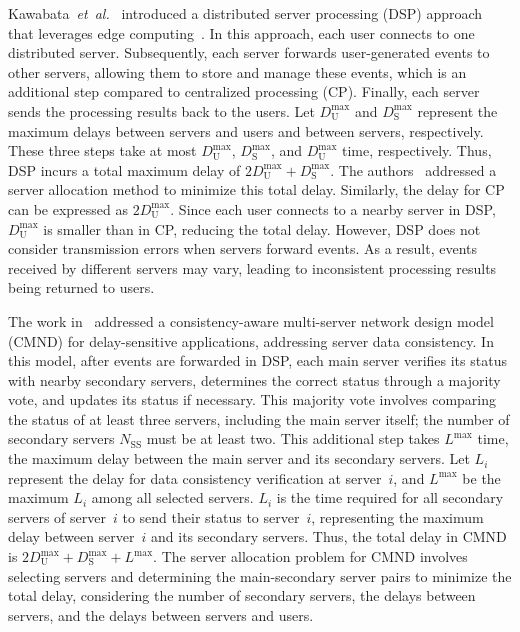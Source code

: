 \documentclass[10pt, letterpaper]{IEEEtran}
\begin{document}
\begin{CJK}{UTF8}{ipxm}
Kawabata~{\it et~al.}~\cite{2Kawabata2017} introduced a distributed server processing (DSP) approach that leverages edge computing~\cite{edge_26,edge_27,edge_28,edge_29}. 
In this approach, each user connects to one distributed server. 
Subsequently, each server forwards user-generated events to other servers, allowing them to store and manage these events, which is an additional step compared to centralized processing (CP). 
Finally, each server sends the processing results back to the users. 
Let $D_\mathrm{U}^{\max}$ and $D_\mathrm{S}^{\max}$ represent the maximum delays between servers and users and between servers, respectively. 
These three steps take at most $D_\mathrm{U}^{\max}$, $D_\mathrm{S}^{\max}$, and $D_\mathrm{U}^{\max}$ time, respectively. 
Thus, DSP incurs a total maximum delay of $2D_\mathrm{U}^{\max} + D_\mathrm{S}^{\max}$. 
The authors~\cite{2Kawabata2017} addressed a server allocation method to minimize this total delay. 
Similarly, the delay for CP can be expressed as $2D_\mathrm{U}^{\max}$. 
Since each user connects to a nearby server in DSP, $D_\mathrm{U}^{\max}$ is smaller than in CP, reducing the total delay. 
However, DSP does not consider transmission errors when servers forward events. 
As a result, events received by different servers may vary, leading to inconsistent processing results being returned to users.

The work in~\cite{KawabataICC2023,CMND} addressed a consistency-aware multi-server network design model (CMND) for delay-sensitive applications, addressing server data consistency.
In this model, after events are forwarded in DSP, each main server verifies its status with nearby secondary servers, determines the correct status through a majority vote, and updates its status if necessary.
This majority vote involves comparing the status of at least three servers, including the main server itself; the number of secondary servers $N_{\mathrm{SS}}$ must be at least two.
This additional step takes $L^{\max}$ time, the maximum delay between the main server and its secondary servers.
Let $L_i$ represent the delay for data consistency verification at server~$i$, and $L^{\max}$ be the maximum $L_i$ among all selected servers.
$L_i$ is the time required for all secondary servers of server~$i$ to send their status to server~$i$, representing the maximum delay between server~$i$ and its secondary servers.
Thus, the total delay in CMND is $2D_\mathrm{U}^{\max} + D_\mathrm{S}^{\max} + L^{\max}$.
The server allocation problem for CMND involves selecting servers and determining the main-secondary server pairs to minimize the total delay, considering the number of secondary servers, the delays between servers, and the delays between servers and users.


\end{CJK}
\end{document}
